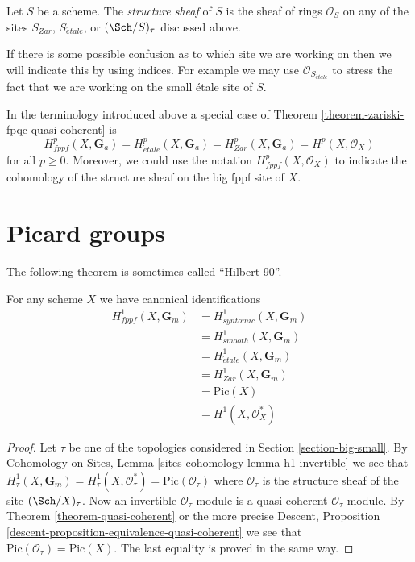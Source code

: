 \begin{definition}
\label{definition-structure-sheaf}
Let $S$ be a scheme. The {\it structure sheaf} of $S$ is the sheaf of rings
$\mathcal{O}_S$
on any of the sites $S_{Zar}$, $S_{\acute{e}tale}$, or $(\Sch/S)_\tau$
discussed above.
\end{definition}

\noindent
If there is some possible confusion as to which site we are working on
then we will indicate this by using indices. For example we may use
$\mathcal{O}_{S_{\acute{e}tale}}$ to stress the fact that we are working on the
small \'etale site of $S$.

\begin{remark}
\label{remark-special-case-fpqc-cohomology-quasi-coherent}
In the terminology introduced above a special case of
Theorem \ref{theorem-zariski-fpqc-quasi-coherent}
is
$$
H_{fppf}^p(X, \mathbf{G}_a) =
H_{\acute{e}tale}^p(X, \mathbf{G}_a) =
H_{Zar}^p(X, \mathbf{G}_a) =
H^p(X, \mathcal{O}_X)
$$
for all $p \geq 0$. Moreover, we could use the notation
$H^p_{fppf}(X, \mathcal{O}_X)$ to indicate the cohomology of the
structure sheaf on the big fppf site of $X$.
\end{remark}




\section{Picard groups}
\label{section-picard-groups}

\noindent
The following theorem is sometimes called ``Hilbert 90''.

\begin{theorem}
\label{theorem-picard-group}
For any scheme $X$ we have canonical identifications
\begin{align*}
H_{fppf}^1(X, \mathbf{G}_m) & = H^1_{syntomic}(X, \mathbf{G}_m) \\
& = H^1_{smooth}(X, \mathbf{G}_m) \\
& = H_{\acute{e}tale}^1(X, \mathbf{G}_m) \\
& = H^1_{Zar}(X, \mathbf{G}_m) \\
& = \text{Pic}(X) \\
& = H^1(X, \mathcal{O}_X^*)
\end{align*}
\end{theorem}

\begin{proof}
Let $\tau$ be one of the topologies considered in
Section \ref{section-big-small}.
By
Cohomology on Sites, Lemma
\ref{sites-cohomology-lemma-h1-invertible}
we see that
$H^1_\tau(X, \mathbf{G}_m) =
H^1_\tau(X, \mathcal{O}_\tau^*) =
\text{Pic}(\mathcal{O}_\tau)$
where $\mathcal{O}_\tau$ is the structure sheaf of the site
$(\Sch/X)_\tau$. Now an invertible $\mathcal{O}_\tau$-module
is a quasi-coherent $\mathcal{O}_\tau$-module.
By Theorem \ref{theorem-quasi-coherent} or the more precise
Descent, Proposition \ref{descent-proposition-equivalence-quasi-coherent}
we see that $\text{Pic}(\mathcal{O}_\tau) = \text{Pic}(X)$.
The last equality is proved in the same way.
\end{proof}






